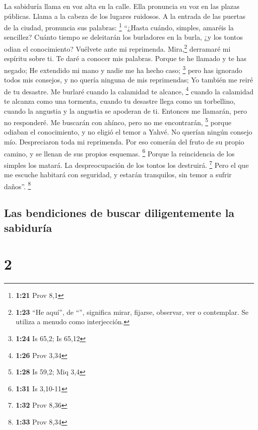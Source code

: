  La sabiduría llama en voz alta en la calle. Ella
pronuncia su voz en las plazas públicas.  Llama a la
cabeza de los lugares ruidosos. A la entrada de las puertas de la
ciudad, pronuncia sus palabras: \footnote{\textbf{1:21} Prov 8,1}
 ``¿Hasta cuándo, simples, amaréis la sencillez? Cuánto
tiempo se deleitarán los burladores en la burla, ¿y los tontos odian el
conocimiento?  Vuélvete ante mi reprimenda.
Mira,\footnote{\textbf{1:23} ``He aquí'', de ``'', significa
  mirar, fijarse, observar, ver o contemplar. Se utiliza a menudo como
  interjección.} derramaré mi espíritu sobre ti. Te daré a conocer mis
palabras.  Porque te he llamado y te has negado; He
extendido mi mano y nadie me ha hecho caso; \footnote{\textbf{1:24} Is
  65,2; Is 65,12}  pero has ignorado todos mis consejos,
y no quería ninguna de mis reprimendas;  Yo también me
reiré de tu desastre. Me burlaré cuando la calamidad te alcance,
\footnote{\textbf{1:26} Prov 3,34}  cuando la calamidad
te alcanza como una tormenta, cuando tu desastre llega como un
torbellino, cuando la angustia y la angustia se apoderan de ti.
 Entonces me llamarán, pero no responderé. Me buscarán
con ahínco, pero no me encontrarán, \footnote{\textbf{1:28} Is 59,2; Miq
  3,4}  porque odiaban el conocimiento, y no eligió el
temor a Yahvé.  No querían ningún consejo mío.
Despreciaron toda mi reprimenda.  Por eso comerán del
fruto de su propio camino, y se llenan de sus propios esquemas.
\footnote{\textbf{1:31} Is 3,10-11}  Porque la
reincidencia de los simples los matará. La despreocupación de los tontos
los destruirá. \footnote{\textbf{1:32} Prov 8,36}  Pero
el que me escuche habitará con seguridad, y estarán tranquilos, sin
temor a sufrir daños''. \footnote{\textbf{1:33} Prov 8,34}

\hypertarget{las-bendiciones-de-buscar-diligentemente-la-sabiduruxeda}{%
\subsection{Las bendiciones de buscar diligentemente la
sabiduría}\label{las-bendiciones-de-buscar-diligentemente-la-sabiduruxeda}}

\hypertarget{section-1}{%
\section{2}\label{section-1}}

